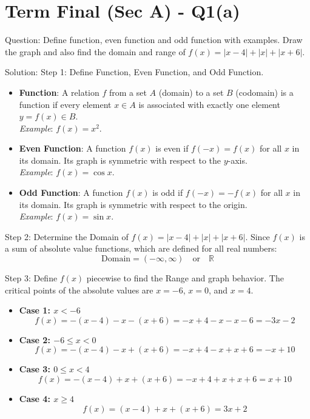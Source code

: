 \documentclass{article}
\begin{document}
\section*{Term Final (Sec A) - Q1(a)}
Question:
Define function, even function and odd function with examples. Draw the graph and also find the domain and range of $f(x) = |x-4| + |x| + |x+6|$.

Solution:
Step 1: Define Function, Even Function, and Odd Function.
\begin{itemize}
    \item \textbf{Function}: A relation $f$ from a set $A$ (domain) to a set $B$ (codomain) is a function if every element $x \in A$ is associated with exactly one element $y = f(x) \in B$.
    \\ \textit{Example}: $f(x) = x^2$.
    \item \textbf{Even Function}: A function $f(x)$ is even if $f(-x) = f(x)$ for all $x$ in its domain. Its graph is symmetric with respect to the $y$-axis.
    \\ \textit{Example}: $f(x) = \cos x$.
    \item \textbf{Odd Function}: A function $f(x)$ is odd if $f(-x) = -f(x)$ for all $x$ in its domain. Its graph is symmetric with respect to the origin.
    \\ \textit{Example}: $f(x) = \sin x$.
\end{itemize}

Step 2: Determine the Domain of $f(x) = |x-4| + |x| + |x+6|$.
Since $f(x)$ is a sum of absolute value functions, which are defined for all real numbers:
\[
\text{Domain} = (-\infty, \infty) \quad \text{or} \quad \mathbb{R}
\]

Step 3: Define $f(x)$ piecewise to find the Range and graph behavior.
The critical points of the absolute values are $x = -6$, $x = 0$, and $x = 4$.
\begin{itemize}
    \item \textbf{Case 1: $x < -6$}
    \[
    f(x) = -(x-4) - x - (x+6) = -x+4-x-x-6 = -3x - 2
    \]
    \item \textbf{Case 2: $-6 \le x < 0$}
    \[
    f(x) = -(x-4) - x + (x+6) = -x+4-x+x+6 = -x + 10
    \]
    \item \textbf{Case 3: $0 \le x < 4$}
    \[
    f(x) = -(x-4) + x + (x+6) = -x+4+x+x+6 = x + 10
    \]
    \item \textbf{Case 4: $x \ge 4$}
    \[
    f(x) = (x-4) + x + (x+6) = 3x + 2
    \]
\end{itemize}
\end{document}
